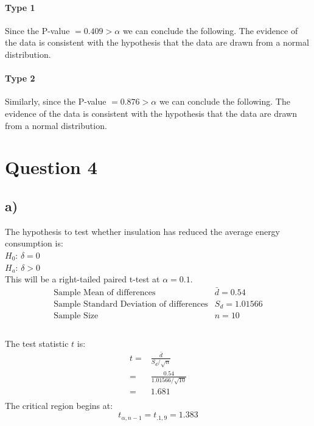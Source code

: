 \documentclass{article}
\begin{document}
\paragraph{Type 1} Since the P-value $= 0.409 > \alpha$ we can conclude the following.
    The evidence of the data is consistent with the hypothesis that the data are drawn from a normal distribution.

\paragraph{Type 2} Similarly, since the P-value $= 0.876 > \alpha$ we can conclude the following.
    The evidence of the data is consistent with the hypothesis that the data are drawn from a normal distribution.

\clearpage
\section*{Question 4}
\subsection*{a)}
The hypothesis to test whether insulation has reduced the average energy consumption is: \\
$H_0$: $\delta = 0$ \\
$H_a$: $\delta > 0$ \\
This will be a right-tailed paired t-test at $\alpha = 0.1$.
\begin{equation*}
  \begin{array}{c|c}
      \text{Sample Mean of differences} & \bar{d} = 0.54 \\
      \text{Sample Standard Deviation of differences} & S_d = 1.01566\\
      \text{Sample Size} & n = 10 \\
  \end{array}
\end{equation*}\\
The test statistic $t$ is:
\begin{align*}
  t = & \frac{\bar{d}}{S_d/\sqrt{n}} \\
    = & \frac{0.54}{1.01566/\sqrt{10}} \\
    = & 1.681 \\
\end{align*}
The critical region begins at:
\begin{equation*}
t_{\alpha , n-1} = t_{.1,9} = 1.383
\end{equation*}\\
\end{document}
